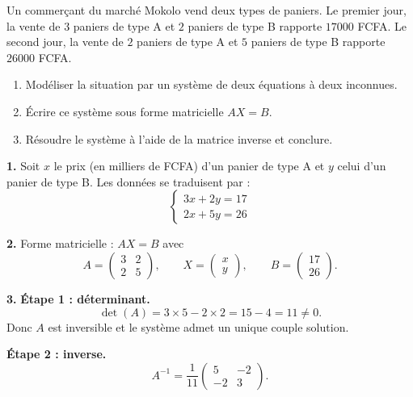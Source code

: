 \documentclass[11pt]{article}
\begin{document}
\begin{exoresolu}
Un commerçant du marché Mokolo vend deux types de paniers. Le premier jour, la vente de $3$ paniers de type A et $2$ paniers de type B rapporte $\num{17000}$ FCFA. Le second jour, la vente de $2$ paniers de type A et $5$ paniers de type B rapporte $\num{26000}$ FCFA.
\begin{enumerate}
\item Modéliser la situation par un système de deux équations à deux inconnues.
\item Écrire ce système sous forme matricielle $AX=B$.
\item Résoudre le système à l'aide de la matrice inverse et conclure.
\end{enumerate}
\tcblower
\textbf{1.} Soit $x$ le prix (en milliers de FCFA) d'un panier de type A et $y$ celui d'un panier de type B. Les données se traduisent par :
\[ \begin{cases} 3x+2y=17 \\ 2x+5y=26 \end{cases} \]

\textbf{2.} Forme matricielle : $AX=B$ avec
\[ A=\begin{pmatrix} 3 & 2 \\ 2 & 5 \end{pmatrix}, \qquad X=\begin{pmatrix} x \\ y \end{pmatrix}, \qquad B=\begin{pmatrix} 17 \\ 26 \end{pmatrix}. \]

\textbf{3.} \textbf{Étape 1 : déterminant.}
\[ \det(A)=3\times 5-2\times 2=15-4=11\neq 0. \]
Donc $A$ est inversible et le système admet un unique couple solution.

\textbf{Étape 2 : inverse.}
\[ A^{-1}=\frac{1}{11}\begin{pmatrix} 5 & -2 \\ -2 & 3 \end{pmatrix}. \]


\end{exoresolu}
\end{document}
